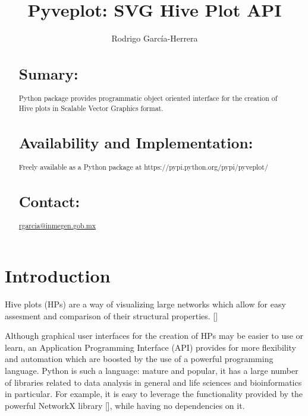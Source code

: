 \documentclass{bioinfo}
\begin{document}

\title[short Title]{Pyveplot: SVG Hive Plot API}
\author[]{Rodrigo Garc\'ia-Herrera}
\address{Department of Bioinformatics, National Institute of Genomic
  Medicine, Periferico Sur 4809, Mexico City 14610}



\maketitle

\begin{abstract}

\section{Sumary:}
Python package provides programmatic object oriented interface for the
creation of Hive plots in Scalable Vector Graphics format.
\section{Availability and Implementation:}
Freely available as a Python package at
https://pypi.python.org/pypi/pyveplot/

\section{Contact:} \href{rgarcia@inmegen.gob.mx}{rgarcia@inmegen.gob.mx}
\end{abstract}

\section{Introduction}

Hive plots (HPs) are a way of visualizing large networks which allow
for easy assesment and comparison of their structural properties.
[\cite{krzywinski2012hive}]

Although graphical user interfaces for the creation of HPs may be
easier to use or learn, an Application Programming Interface (API)
provides for more flexibility and automation which are boosted by the
use of a powerful programming language. Python is such a language:
mature and popular, it has a large number of libraries related to data
analysis in general and life sciences and bioinformatics in
particular. For example, it is easy to leverage the functionality
provided by the powerful NetworkX
library [\cite{hagberg-2008-exploring}], while having no dependencies on
it.
\end{document}
